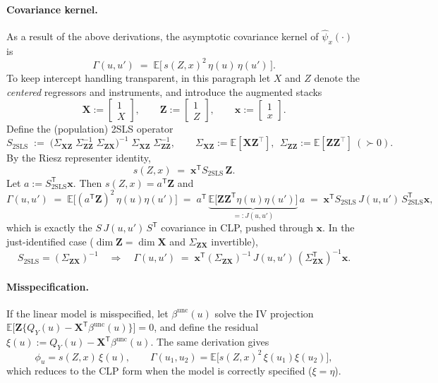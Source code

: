\documentclass[12pt]{article}
\newcommand{\E}{\mathbb{E}}
\newcommand{\T}{\mathsf{T}} %
\newcommand{\CLP}{CLP\xspace}
\begin{document}
\paragraph{Covariance kernel.}
As a result of the above derivations, the asymptotic covariance kernel of $\hat\psi_x(\cdot)$ is
\[
\Gamma(u,u') \;=\; \E\!\big[\,s(Z,x)^2\,\eta(u)\,\eta(u')\,\big].
\]
To keep intercept handling transparent, in this paragraph let $X$ and $Z$ denote the \emph{centered} regressors and instruments, and introduce the augmented stacks
\[
\mathbf{X}:=\begin{bmatrix}1\\ X\end{bmatrix},\qquad
\mathbf{Z}:=\begin{bmatrix}1\\ Z\end{bmatrix},\qquad
\mathbf{x}:=\begin{bmatrix}1\\ x\end{bmatrix}.
\]
Define the (population) 2SLS operator
\[
S_{\mathrm{2SLS}}
\;:=\;
\big(\Sigma_{\mathbf{X}\mathbf{Z}}\;\Sigma_{\mathbf{Z}\mathbf{Z}}^{-1}\;\Sigma_{\mathbf{Z}\mathbf{X}}\big)^{-1}\;
\Sigma_{\mathbf{X}\mathbf{Z}}\;\Sigma_{\mathbf{Z}\mathbf{Z}}^{-1},
\qquad
\Sigma_{\mathbf{X}\mathbf{Z}}:=\E[\mathbf{X}\mathbf{Z}^\top],\ \ 
\Sigma_{\mathbf{Z}\mathbf{Z}}:=\E[\mathbf{Z}\mathbf{Z}^\top]\ (\succ0).
\]
By the Riesz representer identity,
\[
s(Z,x)\;=\;\mathbf{x}^{\T}S_{\mathrm{2SLS}}\,\mathbf{Z}.
\]
Let $a:=S_{\mathrm{2SLS}}^{\T}\mathbf{x}$. Then $s(Z,x)=a^{\T}\mathbf{Z}$ and
\[
\Gamma(u,u')
\;=\; \E\!\big[(a^{\T}\mathbf{Z})^2\,\eta(u)\eta(u')\big]
\;=\; a^{\T}\,\underbrace{\E\!\big[\mathbf{Z}\mathbf{Z}^{\T}\eta(u)\eta(u')\big]}_{=:J(u,u')}\,a
\;=\; \mathbf{x}^{\T} S_{\mathrm{2SLS}}\,J(u,u')\,S_{\mathrm{2SLS}}^{\T} \mathbf{x},
\]
which is exactly the $S\,J(u,u')\,S^{\T}$ covariance in \CLP, pushed through $\mathbf{x}$. In the just-identified case
($\dim\mathbf{Z}=\dim\mathbf{X}$ and $\Sigma_{\mathbf{Z}\mathbf{X}}$ invertible),
\[
S_{\mathrm{2SLS}}=(\Sigma_{\mathbf{Z}\mathbf{X}})^{-1}
\quad\Longrightarrow\quad
\Gamma(u,u') \;=\; \mathbf{x}^{\T}(\Sigma_{\mathbf{Z}\mathbf{X}})^{-1}\,J(u,u')\,(\Sigma_{\mathbf{Z}\mathbf{X}}^{\T})^{-1}\mathbf{x}.
\]

\paragraph{Misspecification.}
If the linear model is misspecified, let $\beta^{\text{unc}}(u)$ solve the IV projection
$\E\big[\mathbf{Z}\{Q_Y(u)-\mathbf{X}^{\T}\beta^{\text{unc}}(u)\}\big]=0$, and define the residual
$\xi(u):=Q_Y(u)-\mathbf{X}^{\T}\beta^{\text{unc}}(u)$. The same derivation gives
\[
\phi_u=s(Z,x)\,\xi(u),\qquad
\Gamma(u_1,u_2)=\E\!\big[s(Z,x)^2\,\xi(u_1)\xi(u_2)\big],
\]
which reduces to the \CLP form when the model is correctly specified ($\xi=\eta$).
\end{document}
